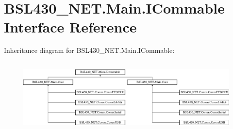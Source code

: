 \hypertarget{interface_b_s_l430___n_e_t_1_1_main_1_1_i_commable}{}\section{B\+S\+L430\+\_\+\+N\+E\+T.\+Main.\+I\+Commable Interface Reference}
\label{interface_b_s_l430___n_e_t_1_1_main_1_1_i_commable}
Inheritance diagram for B\+S\+L430\+\_\+\+N\+E\+T.\+Main.\+I\+Commable\+:\begin{figure}[H]
\begin{center}
\leavevmode
\includegraphics[height=3.818182cm]{interface_b_s_l430___n_e_t_1_1_main_1_1_i_commable}
\end{center}
\end{figure}

